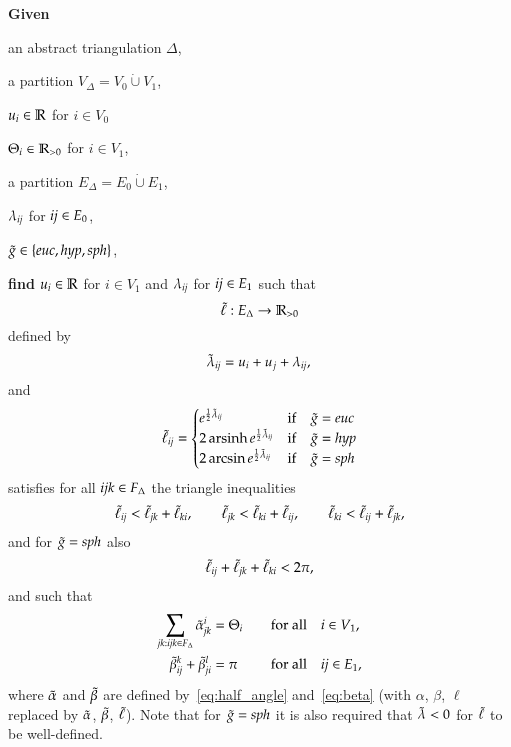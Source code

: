 \documentclass[Thesis]{subfiles}
\begin{document}
\begin{problem}
  \label{prob:analytic}
  \textbf{Given}
  \begin{compactitem}
  \item an abstract triangulation $\Delta$,
  \item a partition $V_{\Delta}=V_0\dot\cup V_1$,
  \item $u_{i}\in\mathbb R$ for $i\in{V_{0}}$
  \item $\Theta_{i}\in\mathbb R_{>0}$ for $i\in{V_{1}}$,
  \item a partition $E_{\Delta}=E_{0}\dot\cup E_{1}$,
  \item $\lambda_{\it ij}$ for ${\it ij}\in{E_{0}}$,
  \item $\gt\in\{\euc, \hyp, \sph\}$,
  \end{compactitem}
  \textbf{find} $u_{i}\in\mathbb R$ for $i\in{V_{1}}$ and $\lambda_{\it ij}$
  for ${\it ij}\in{E_{1}}$
  such that 
  \begin{equation*}
    \tilde{\ell}:E_{\Delta}\rightarrow\mathbb R_{>0}
  \end{equation*}
  defined by
  \begin{equation}
    \label{eq:lambdat}
    \tilde{\lambda}_{\it ij} = u_{i} + u_{j} + \lambda_{\it ij},\\
  \end{equation}
  and
  \begin{equation}
    \label{eq:ellt}
    \ellt_{\it ij} =
    \begin{cases}
      e^{\frac{1}{2}\lambdat_{\it ij}} & \text{if}\quad \gt=\euc\\
      2\arsinh e^{\frac{1}{2}\lambdat_{\it ij}} & \text{if}\quad \gt=\hyp\\
      2\arcsin e^{\frac{1}{2}\lambdat_{\it ij}} & \text{if}\quad \gt=\sph\\
    \end{cases}    
  \end{equation}
  satisfies for all ${\it ijk}\in F_{\Delta}$ the triangle inequalities
  \begin{equation}
    \label{eq:triang_ineq}
    \tilde{\ell}_{\it ij}<\tilde{\ell}_{\it jk}+\tilde{\ell}_{\it ki},\qquad
    \tilde{\ell}_{\it jk}<\tilde{\ell}_{\it ki}+\tilde{\ell}_{\it ij},\qquad
    \tilde{\ell}_{\it ki}<\tilde{\ell}_{\it ij}+\tilde{\ell}_{\it jk},
  \end{equation}
  and for
  $\tilde{g}=\mathit{sph}$ also
  \begin{equation}
    \label{eq:triang_ineq_sph}
    \tilde{\ell}_{\it ij}+\tilde{\ell}_{\it jk}+\tilde{\ell}_{\it ki}<2\pi,
  \end{equation}
   and such that
    \begin{alignat}{2}
    \label{eq:vertex_system}
    \sum_{{\it jk}:{\it ijk}\in F_{\Delta}}\tilde{\alpha}_{\it jk}^i &= \Theta_i&
    \quad&\text{for all}\quad i\in V_{1},\\
    \label{eq:edge_system}
    \tilde{\beta}_{\it ij}^k+\tilde{\beta}_{\it ji}^l &= \pi& 
    \quad&\text{for all}\quad
    \textit{ij} \in E_{1},
  \end{alignat}
  where $\tilde{\alpha}$ and $\tilde{\beta}$ are defined by~\eqref{eq:half_angle}
  and~\eqref{eq:beta} (with $\alpha$, $\beta$, $\ell$ replaced by
  $\tilde{\alpha}$, $\tilde{\beta}$, $\tilde{\ell}$). Note that for $\tilde{g}=\mathit{sph}$ it is also required
  that $\tilde{\lambda}<0$ for $\tilde{\ell}$ to be well-defined.
\end{problem}
\end{document}
